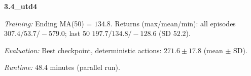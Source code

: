 \noindent\textbf{3.4_utd4}\par
\emph{Training:} Ending MA(50) = $134.8$. Returns (max/mean/min): all episodes $307.4/53.7/-579.0$; last 50 $197.7/134.8/-128.6$ (SD $52.2$).\par
\emph{Evaluation:} Best checkpoint, deterministic actions: $271.6\pm 17.8$ (mean $\pm$ SD).\par
\emph{Runtime:} $48.4$ minutes (parallel run).\par
